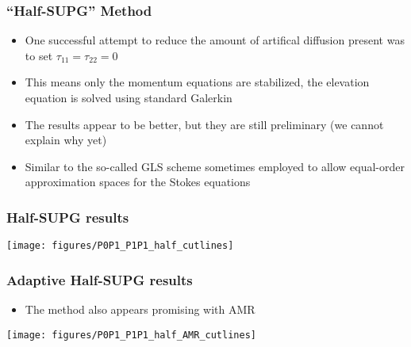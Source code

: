 \begin{frame}[t]
  \frametitle{``Half-SUPG'' Method}
  \begin{itemize}[<+->]
    \item{
      One successful attempt to reduce the amount of artifical diffusion
      present was to set $\tau_{11}=\tau_{22}=0$
    }
    \item{This means only the momentum equations are stabilized, the
      elevation equation is solved using standard Galerkin}
    \item{The results appear to be better, but they are still preliminary
      (we cannot explain why yet)}
    \item{Similar to the so-called GLS scheme sometimes employed to
      allow equal-order approximation spaces for the Stokes equations}
  \end{itemize}
\end{frame}


\begin{frame}[t]
  \frametitle{Half-SUPG results}
  \begin{center}
    \texttt{[image: figures/P0P1\_P1P1\_half\_cutlines]}
  \end{center}
\end{frame}

\begin{frame}[t]
  \frametitle{Adaptive Half-SUPG results}
  \begin{itemize}
    \item{The method also appears promising with AMR}
  \end{itemize}
  \vspace{-.2in}
  \begin{center}
    \texttt{[image: figures/P0P1\_P1P1\_half\_AMR\_cutlines]}
  \end{center}
\end{frame}

